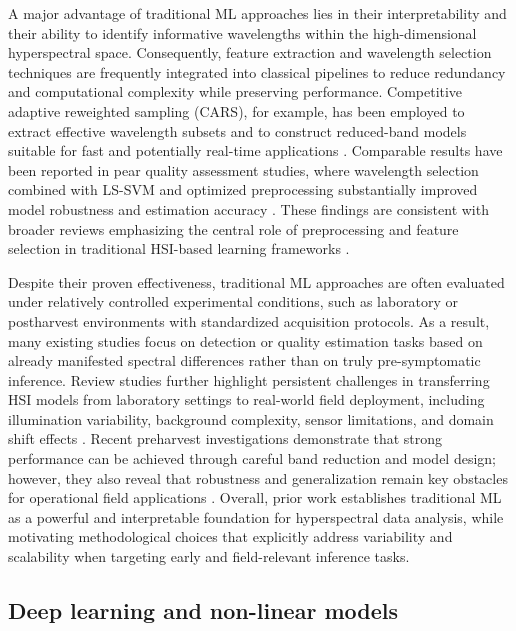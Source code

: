 \medskip
\noindent
A major advantage of traditional ML approaches lies in their interpretability and their ability to identify informative wavelengths within the high-dimensional hyperspectral space. Consequently, feature extraction and wavelength selection techniques are frequently integrated into classical pipelines to reduce redundancy and computational complexity while preserving performance. Competitive adaptive reweighted sampling (CARS), for example, has been employed to extract effective wavelength subsets and to construct reduced-band models suitable for fast and potentially real-time applications \cite{agriculture13051086}. Comparable results have been reported in pear quality assessment studies, where wavelength selection combined with LS-SVM and optimized preprocessing substantially improved model robustness and estimation accuracy \cite{foods13233956}. These findings are consistent with broader reviews emphasizing the central role of preprocessing and feature selection in traditional HSI-based learning frameworks \cite{RAM2024109037}.

\medskip
\noindent
Despite their proven effectiveness, traditional ML approaches are often evaluated under relatively controlled experimental conditions, such as laboratory or postharvest environments with standardized acquisition protocols. As a result, many existing studies focus on detection or quality estimation tasks based on already manifested spectral differences rather than on truly pre-symptomatic inference. Review studies further highlight persistent challenges in transferring HSI models from laboratory settings to real-world field deployment, including illumination variability, background complexity, sensor limitations, and domain shift effects \cite{RAM2024109037, su16146064}. Recent preharvest investigations demonstrate that strong performance can be achieved through careful band reduction and model design; however, they also reveal that robustness and generalization remain key obstacles for operational field applications \cite{c5ae649d7cf34cb7aaf3b08a25dbd79d}. Overall, prior work establishes traditional ML as a powerful and interpretable foundation for hyperspectral data analysis, while motivating methodological choices that explicitly address variability and scalability when targeting early and field-relevant inference tasks.


\subsection{Deep learning and non-linear models}

